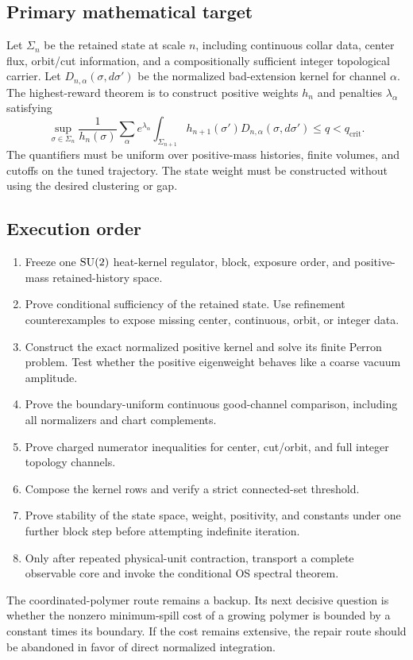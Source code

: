 \subsection{Primary mathematical target}

Let \(\Sigma_n\) be the retained state at scale \(n\), including continuous
collar data, center flux, orbit/cut information, and a compositionally
sufficient integer topological carrier.  Let
\(D_{n,\alpha}(\sigma,d\sigma')\) be the normalized bad-extension kernel for
channel \(\alpha\).  The highest-reward theorem is to construct positive
weights \(h_n\) and penalties \(\lambda_\alpha\) satisfying
\begin{equation}
 \boxed{
 \sup_{\sigma\in\Sigma_n}\frac{1}{h_n(\sigma)}
 \sum_\alpha e^{\lambda_\alpha}
 \int_{\Sigma_{n+1}}h_{n+1}(\sigma')
 D_{n,\alpha}(\sigma,d\sigma')
 \le q<q_{\mathrm{crit}}.}
\end{equation}
The quantifiers must be uniform over positive-mass histories, finite volumes,
and cutoffs on the tuned trajectory.  The state weight must be constructed
without using the desired clustering or gap.

\subsection{Execution order}

\begin{enumerate}[label=\arabic*.]
\item Freeze one \(\mathrm{SU}(2)\) heat-kernel regulator, block, exposure order, and
positive-mass retained-history space.
\item Prove conditional sufficiency of the retained state.  Use refinement
counterexamples to expose missing center, continuous, orbit, or integer data.
\item Construct the exact normalized positive kernel and solve its finite
Perron problem.  Test whether the positive eigenweight behaves like a coarse
vacuum amplitude.
\item Prove the boundary-uniform continuous good-channel comparison, including
all normalizers and chart complements.
\item Prove charged numerator inequalities for center, cut/orbit, and full
integer topology channels.
\item Compose the kernel rows and verify a strict connected-set threshold.
\item Prove stability of the state space, weight, positivity, and constants
under one further block step before attempting indefinite iteration.
\item Only after repeated physical-unit contraction, transport a complete
observable core and invoke the conditional OS spectral theorem.
\end{enumerate}

The coordinated-polymer route remains a backup.  Its next decisive question
is whether the nonzero minimum-spill cost of a growing polymer is bounded by a
constant times its boundary.  If the cost remains extensive, the repair route
should be abandoned in favor of direct normalized integration.
